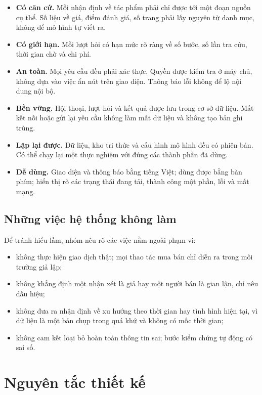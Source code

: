 \begin{itemize}
    \item \textbf{Có căn cứ.} Mỗi nhận định về tác phẩm phải chỉ được tới một đoạn nguồn cụ thể. Số liệu về giá, điểm đánh giá, số trang phải lấy nguyên từ danh mục, không để mô hình tự viết ra.
    \item \textbf{Có giới hạn.} Mỗi lượt hỏi có hạn mức rõ ràng về số bước, số lần tra cứu, thời gian chờ và chi phí.
    \item \textbf{An toàn.} Mọi yêu cầu đều phải xác thực. Quyền được kiểm tra ở máy chủ, không dựa vào việc ẩn nút trên giao diện. Thông báo lỗi không để lộ nội dung nội bộ.
    \item \textbf{Bền vững.} Hội thoại, lượt hỏi và kết quả được lưu trong cơ sở dữ liệu. Mất kết nối hoặc gửi lại yêu cầu không làm mất dữ liệu và không tạo bản ghi trùng.
    \item \textbf{Lặp lại được.} Dữ liệu, kho tri thức và cấu hình mô hình đều có phiên bản. Có thể chạy lại một thực nghiệm với đúng các thành phần đã dùng.
    \item \textbf{Dễ dùng.} Giao diện và thông báo bằng tiếng Việt; dùng được bằng bàn phím; hiển thị rõ các trạng thái đang tải, thành công một phần, lỗi và mất mạng.
\end{itemize}

\subsection{Những việc hệ thống không làm}

Để tránh hiểu lầm, nhóm nêu rõ các việc nằm ngoài phạm vi:

\begin{itemize}
    \item không thực hiện giao dịch thật; mọi thao tác mua bán chỉ diễn ra trong môi trường giả lập;
    \item không khẳng định một nhận xét là giả hay một người bán là gian lận, chỉ nêu dấu hiệu;
    \item không đưa ra nhận định về xu hướng theo thời gian hay tình hình hiện tại, vì dữ liệu là một bản chụp trong quá khứ và không có mốc thời gian;
    \item không cam kết loại bỏ hoàn toàn thông tin sai; bước kiểm chứng tự động có sai số.
\end{itemize}

\section{Nguyên tắc thiết kế}

